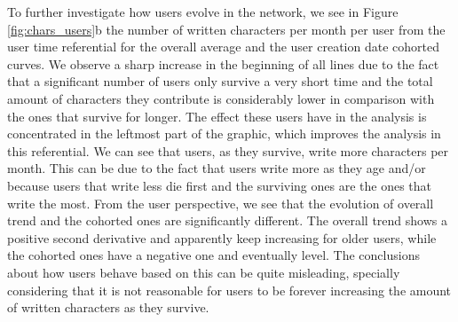 To further investigate how users evolve in the network, we see in Figure \ref{fig:chars_users}b the number of written characters per month per user from the user time referential for the overall average and the user creation date cohorted curves. We observe a sharp increase in the beginning of all lines due to the fact that a significant number of users only survive a very short time and the total amount of characters they contribute is considerably lower in comparison with the ones that survive for longer. The effect these users have in the analysis is concentrated in the leftmost part of the graphic, which improves the analysis in this referential. We can see that users, as they survive, write more characters per month. This can be due to the fact that users write more as they age and/or because users that write less die first and the surviving ones are the ones that write the most. From the user perspective, we see that the evolution of overall trend and the cohorted ones are significantly different. The overall trend shows a positive second derivative and apparently keep increasing for older users, while the cohorted ones have a negative one and eventually level. The conclusions about how users behave based on this can be quite misleading, specially considering that it is not reasonable for users to be forever increasing the amount of written characters as they survive.


